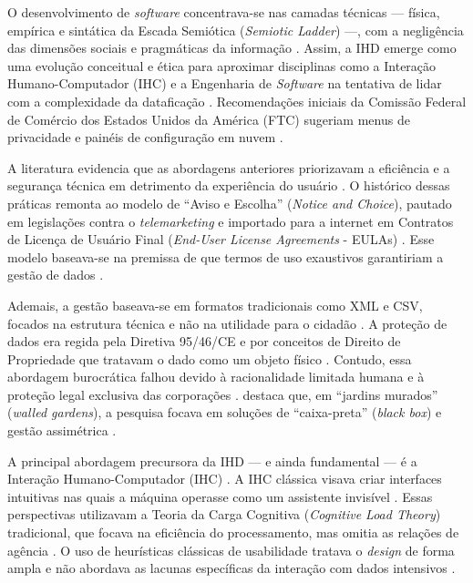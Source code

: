 \documentclass[
	12pt,				%
	oneside,			%
	a4paper,			%
	english,			%
	brazil				%
	]{abntex2ppgsi}
\begin{document}
    O desenvolvimento de \textit{software} concentrava-se nas camadas técnicas — física, empírica e sintática da Escada Semiótica (\textit{Semiotic Ladder}) —, com a negligência das dimensões sociais e pragmáticas da informação \cite{Strey2019Human}. Assim, a IHD emerge como uma evolução conceitual e ética para aproximar disciplinas como a Interação Humano-Computador (IHC) e a Engenharia de \textit{Software} na tentativa de lidar com a complexidade da dataficação \cite{Strey2019Human, Pereira, Sailaja2024334, Bowyer2022, Bartram2022, Koesten2020, Haghighati2020, Koesten2021, Coleti2019DesigPatterns}. Recomendações iniciais da Comissão Federal de Comércio dos Estados Unidos da América (FTC) sugeriam menus de privacidade e painéis de configuração em nuvem \cite{Crabtree2016}.

    A literatura evidencia que as abordagens anteriores priorizavam a eficiência e a segurança técnica em detrimento da experiência do usuário \cite{Coleti2024, Meechan2023, Locoro2020}. O histórico dessas práticas remonta ao modelo de ``Aviso e Escolha'' (\textit{Notice and Choice}), pautado em legislações contra o \textit{telemarketing} e importado para a internet em Contratos de Licença de Usuário Final (\textit{End-User License Agreements} - EULAs) \cite{Coleti2020TR, Hutton2017, Jones2017}. Esse modelo baseava-se na premissa de que termos de uso exaustivos garantiriam a gestão de dados \cite{malgieri2020vulnerable, chalhoub2024useful}. 

    Ademais, a gestão baseava-se em formatos tradicionais como XML e CSV, focados na estrutura técnica e não na utilidade para o cidadão \cite{Belizario2023Interacao}. A proteção de dados era regida pela Diretiva 95/46/CE e por conceitos de Direito de Propriedade que tratavam o dado como um objeto físico \cite{malgieri2019automated, janecek2018ownership, angelopoulos2021stewardship}. Contudo, essa abordagem burocrática falhou devido à racionalidade limitada humana e à proteção legal exclusiva das corporações \cite{Sailaja2021, Chatzimichali2021160, DeAlmeida2019}.  destaca que, em ``jardins murados'' (\textit{walled gardens}), a pesquisa focava em soluções de ``caixa-preta'' (\textit{black box}) e gestão assimétrica \cite{DOWTHWAITE2024, Theys2024, Theys, Turkay2021, Lockwood2021, Crabtree2021, Lockwood2020AnAccessible}.

    A principal abordagem precursora da IHD — e ainda fundamental — é a Interação Humano-Computador (IHC) \cite{Coleti2024, Sailaja2021, Calvetti2021173, Victorelli2020Human, Strey2019Human}. A IHC clássica visava criar interfaces intuitivas nas quais a máquina operasse como um assistente invisível \cite{calvetti2024human, Konomi2022, Sailaja2021, Alhakamy2021}. Essas perspectivas utilizavam a Teoria da Carga Cognitiva (\textit{Cognitive Load Theory}) tradicional, que focava na eficiência do processamento, mas omitia as relações de agência \cite{cezar2023cognitive}. O uso de heurísticas clássicas de usabilidade tratava o \textit{design} de forma ampla e não abordava as lacunas específicas da interação com dados intensivos \cite{Capeleti2024Human}. 
\end{document}
